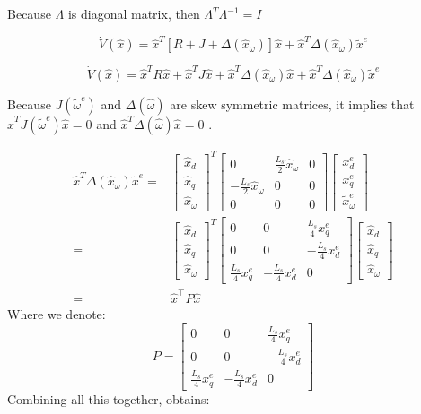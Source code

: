 \documentclass[conference]{IEEEtran}
\begin{document}
Because $\Lambda$ is diagonal matrix, then $\Lambda^{T}\Lambda^{-1}=I$

$$
\dot{V}(\hat{x})=\hat{x}^{T}\left[R+J+\Delta(\hat{x}_{\omega})\right]\hat{x}+\hat{x}^{T}\Delta(\hat{x}_{\omega})\tilde{x}^{e}
$$

$$
\dot{V}(\hat{x})=\hat{x}^{T}R\hat{x}+\hat{x}^{T}J\hat{x}+\hat{x}^{T}\Delta(\hat{x}_{\omega})\hat{x}+\hat{x}^{T}\Delta(\hat{x}_{\omega})\tilde{x}^{e}
$$

Because $J(\tilde{\omega}^{e})$ and $\Delta(\hat{\omega})$ are skew
symmetric matrices, it implies that $\hat{x}^{T}J(\tilde{\omega}^{e})\hat{x}=0$
and $\hat{x}^{T}\Delta(\hat{\omega})\hat{x}=0$ .

$$
\begin{aligned}
\hat{x}^{T}\Delta(\hat{x}_{\omega})\tilde{x}^{e}  = &\left[\begin{array}{c}
\hat{x}_{d}\\
\hat{x}_{q}\\
\hat{x}_{\omega}
\end{array}\right]^{T}\left[\begin{array}{ccc}
0 & \frac{L_{s}}{2}\hat{x}_{\omega} & 0\\
-\frac{L_{s}}{2}\hat{x}_{\omega} & 0 & 0\\
0 & 0 & 0
\end{array}\right]\left[\begin{array}{c}
x_{d}^{e}\\
x_{q}^{e}\\
\tilde{x}_{\omega}^{e}
\end{array}\right]\\
  =&  \left[\begin{array}{c}
\hat{x}_{d}\\
\hat{x}_{q}\\
\hat{x}_{\omega}
\end{array}\right]^{T}\left[\begin{array}{ccc}
0 & 0 & \frac{L_{s}}{4}x_{q}^{e}\\
0 & 0 & -\frac{L_{s}}{4}x_{d}^{e}\\
\frac{L_{s}}{4}x_{q}^{e} & -\frac{L_{s}}{4}x_{d}^{e} & 0
\end{array}\right]\left[\begin{array}{c}
\hat{x}_{d}\\
\hat{x}_{q}\\
\hat{x}_{\omega}
\end{array}\right]
\\= & \hat{x}^{\top}P\hat{x}
\end{aligned}
$$
Where we denote:
$$
P=\left[\begin{array}{ccc}
0 & 0 & \frac{L_{s}}{4}x_{q}^{e}\\
0 & 0 & -\frac{L_{s}}{4}x_{d}^{e}\\
\frac{L_{s}}{4}x_{q}^{e} & -\frac{L_{s}}{4}x_{d}^{e} & 0
\end{array}\right]
$$
Combining all this together, obtains: 
\end{document}
